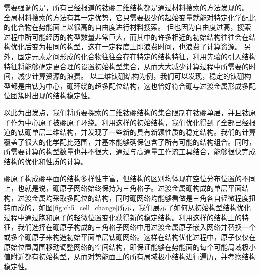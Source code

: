 需要强调的是，所有已经报道的钛硼二维结构都是通过材料搜索的方法发现的。
全局材料搜索的方法有其一定优势，它只需要极少的起始变量就能对特定化学配比的化合物在势能面上以很高的自由度进行材料搜索。
但也因为自由度过高，搜索过程中所可能经历的构型数量非常巨大，而其中的许多相近的初始结构往往会在结构优化后变为相同的构型，这在一定程度上即浪费时间，也浪费了计算资源。
另外，固定元素之间形成的化合物往往会存在特定的结构特征，利用先验的引入结构特征将能够确定更合理的设置初始构型集合，从而大大减少计算过程中所需要的时间，减少计算资源的浪费。
以二维钛硼结构为例，我们可以发现，稳定的钛硼构型都是由钛为中心，硼环绕的超多配位结构，这也恰好符合硼与过渡金属形成多配位团簇时出现的结构稳定性。

以此为出发点，我们将所要探索的二维钛硼结构的集合限制在钛硼单层，并且钛原子作为中心原子被硼原子环绕。利用这样的初始结构，我们优化得到了全部已经报道的钛硼单层二维结构，并发现了一些新的具有新颖性质的稳定结构。我们的计算覆盖了很大的化学配比范围，并基本能够确保包含了所有可能的结构组合。同时，所需要计算的构型数量也并不很大，通过与高通量工作流工具结合，能够很快完成结构的优化和性质的计算。

硼原子构成硼平面的结构多样性丰富，但结构的区别均体现在空位分布位置的不同上，也就是说，硼原子网络始终保持为三角格子。过渡金属硼构成的单层平面结构，过渡金属均采取多配位的结构，同时硼网络均能够看做是三角各自轻微程度扭转而成的，如图\ref{fig:ch5_cell_change}所示，我们展示了如何从初始构型结构优化过程中通过胞和原子的轻微位置变化获得新的稳定结构。利用这样的结构上的特征，我们选择在硼原子构成的三角格子网络中用过渡金属原子嵌入网络并替换一个或多个硼原子来构造初始平面单层钛硼网络。这样在结构优化过程中，原子仅仅在原始位置周围移动调整网络的空间结构，即保证能够在势能面的每个可能局域极小值附近都有初始构型，从而对势能面上的所有局域极小结构进行遍历，并考察结构稳定性。


